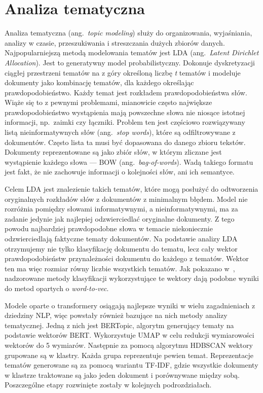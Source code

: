 
\chapter{Analiza tematyczna}\label{sec:topic_modeling}
	Analiza tematyczna (ang.\ \emph{topic modeling}) służy do organizowania, wyjaśniania, analizy w czasie, przeszukiwania i streszczania dużych zbiorów danych.
	Najpopularniejszą metodą modelowania tematów jest LDA (ang.\ \emph{Latent Dirichlet Allocation})\cite{LDA}.
	Jest to generatywny model probabilistyczny.
	Dokonuje dyskretyzacji ciągłej przestrzeni tematów na z góry określoną liczbę \emph{t} tematów
		i modeluje dokumenty jako kombinację tematów, dla każdego określając prawdopodobieństwo.
	Każdy temat jest rozkładem prawdopodobieństwa słów.
	Wiąże się to z pewnymi problemami, mianowicie często największe prawdopodobieństwo wystąpienia mają powszechne słowa nie niosące istotnej informacji, np.\ zaimki czy łączniki.
	Problem ten jest częściowo rozwiązywany listą nieinformatywnych słów (ang.\ \emph{stop words}), które są odfiltrowywane z dokumentów.
	Często lista ta musi być dopasowana do danego zbioru tekstów.
	Dokumenty reprezentowane są jako zbiór słów, w którym zliczane jest wystąpienie każdego słowa --- BOW (ang.\ \emph{bag-of-words}).
	Wadą takiego formatu jest fakt, że nie zachowuje informacji o kolejności słów, ani ich semantyce.

	Celem LDA jest znalezienie takich tematów, które mogą posłużyć do odtworzenia oryginalnych rozkładów słów z dokumentów z minimalnym błędem.
	Model nie rozróżnia pomiędzy słowami informatywnymi, a nieinformatywnymi, ma za zadanie jedynie jak najlepiej odzwierciedlać oryginalne dokumenty.
	Z tego powodu najbardziej prawdopodobne słowa w temacie niekoniecznie odzwierciedlają faktyczne tematy dokumentów.
	Na podstawie analizy LDA otrzymujemy nie tylko klasyfikację dokumentu do tematu, lecz cały wektor prawdopodobieństw przynależności dokumentu do każdego z tematów.
	Wektor ten ma więc rozmiar równy liczbie wszystkich tematów.
	Jak pokazano w~\cite{BoW_PL}, nadzorowane metody klasyfikacji wykorzystujące te wektory dają podobne wyniki do metod opartych o \emph{word-to-vec}.

	Modele oparte o transformery osiągają najlepsze wyniki w wielu zagadnieniach z dziedziny NLP\cite{KLEJ},
		więc powstały również bazujące na nich metody analizy tematycznej.
	Jedną z nich jest BERTopic\cite{BERTopic}, algorytm generujący tematy na podstawie wektorów BERT\@.
	Wykorzystuje UMAP\cite{UMAP} w celu redukcji wymiarowości wektorów do 5 wymiarów.
	Następnie za pomocą algorytmu HDBSCAN\cite{HDBSCAN} wektory grupowane są w klastry.
	Każda grupa reprezentuje pewien temat.
	Reprezentacje tematów generowane są za pomocą wariantu TF-IDF\@,
		gdzie wszystkie dokumenty w klastrze traktowane są jako jeden dokument i porównywane między sobą.
	Poszczególne etapy rozwinięte zostały w kolejnych podrozdziałach.

